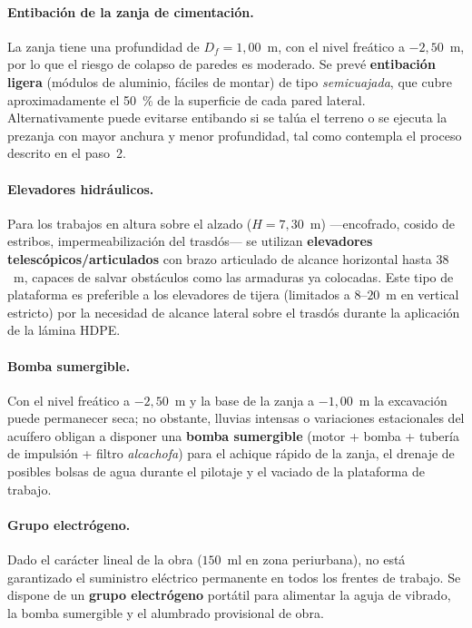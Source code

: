 \paragraph{Entibación de la zanja de cimentación.}
La zanja tiene una profundidad de $D_f = 1{,}00$~m, con el nivel freático
a $-2{,}50$~m, por lo que el riesgo de colapso de paredes es moderado. Se
prevé \textbf{entibación ligera} (módulos de aluminio, fáciles de montar)
de tipo \emph{semicuajada}, que cubre aproximadamente el 50~\% de la
superficie de cada pared lateral. Alternativamente puede evitarse
entibando si se talúa el terreno o se ejecuta la prezanja con mayor anchura
y menor profundidad, tal como contempla el proceso descrito en el paso~2.

\paragraph{Elevadores hidráulicos.}
Para los trabajos en altura sobre el alzado ($H = 7{,}30$~m) —encofrado,
cosido de estribos, impermeabilización del trasdós— se utilizan
\textbf{elevadores telescópicos/articulados} con brazo articulado de
alcance horizontal hasta $38$~m, capaces de salvar obstáculos como las
armaduras ya colocadas. Este tipo de plataforma es preferible a los
elevadores de tijera (limitados a $8$–$20$~m en vertical estricto) por la
necesidad de alcance lateral sobre el trasdós durante la aplicación de
la lámina HDPE.

\paragraph{Bomba sumergible.}
Con el nivel freático a $-2{,}50$~m y la base de la zanja a $-1{,}00$~m
la excavación puede permanecer seca; no obstante, lluvias intensas o
variaciones estacionales del acuífero obligan a disponer una
\textbf{bomba sumergible} (motor + bomba + tubería de impulsión + filtro
\emph{alcachofa}) para el achique rápido de la zanja, el drenaje de
posibles bolsas de agua durante el pilotaje y el vaciado de la plataforma
de trabajo.

\paragraph{Grupo electrógeno.}
Dado el carácter lineal de la obra ($150$~ml en zona periurbana), no está
garantizado el suministro eléctrico permanente en todos los frentes de
trabajo. Se dispone de un \textbf{grupo electrógeno} portátil para
alimentar la aguja de vibrado, la bomba sumergible y el alumbrado
provisional de obra.

